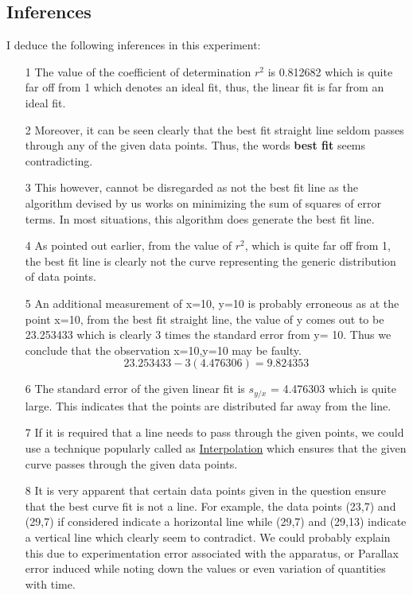 \documentclass[titlepage, 11pt]{article}
\begin{document}

\subsection{Inferences}
I deduce the following inferences in this experiment:
\begin{itemize}
    \item [1] The value of the coefficient of determination $r^2$ is 0.812682 which is quite far off from 1 which denotes an ideal fit, thus, the linear fit is far from an ideal fit. 
    \item [2] Moreover, it can be seen clearly that the best fit straight line seldom passes through any of the given data points. Thus, the words \textbf{best fit} seems contradicting. 
    \item [3] This however, cannot be disregarded as not the best fit line as the algorithm devised by us works on minimizing the sum of squares of error terms. In most situations, this algorithm does generate the best fit line. 
    \item [4] As pointed out earlier, from the value of $r^2$, which is quite far off from 1, the best fit line is clearly not the curve representing the generic distribution of data points. 
    \item [5] An additional measurement of x=10, y=10 is probably erroneous as at the point x=10, from the best fit straight line, the value of y comes out to be 23.253433 which is clearly 3 times the standard error from y= 10. Thus we conclude that the observation x=10,y=10 may be faulty. 
    \begin{equation}
        23.253433 - 3 (4.476306) = 9.824353
    \end{equation}
    \item [6] The standard error of the given linear fit is $s_{y/x}$ = 4.476303 which is quite large. This indicates that the points are distributed far away from the line. 
    \item [7] If it is required that a line needs to pass through the given points, we could use a technique popularly called as \href{https://en.wikipedia.org/wiki/Interpolation}{Interpolation} which ensures that the given curve passes through the given data points. 
    \item [8] It is very apparent that certain data points given in the question ensure that the best curve fit is not a line. For example, the data points (23,7) and (29,7) if considered indicate a horizontal line while (29,7) and (29,13) indicate a vertical line which clearly seem to contradict. We could probably explain this due to experimentation error associated with the apparatus, or Parallax error induced while noting down the values or even variation of quantities with time.
\end{itemize}
\end{document}
